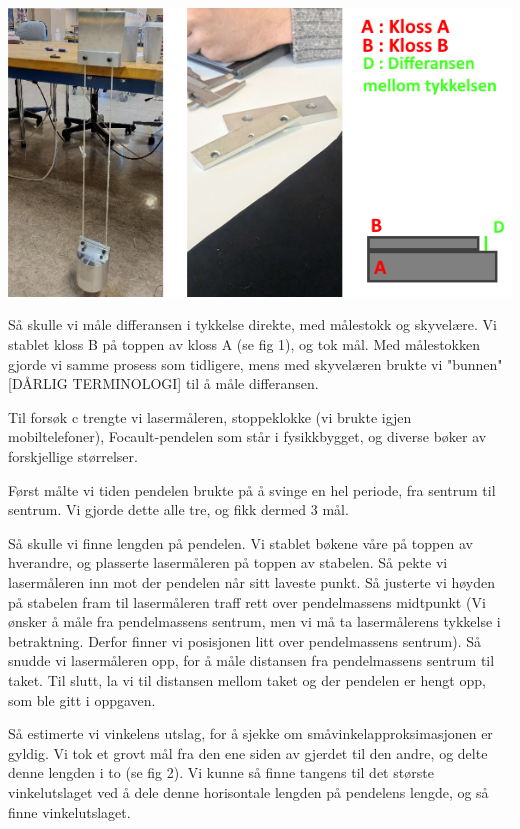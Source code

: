 \bigskip \hfil
\includegraphics[scale = 0.8]{Figurer/Lab_Fig_1.png} 
\par \bigskip

Så skulle vi måle differansen i tykkelse direkte, med målestokk og skyvelære. Vi stablet kloss B på toppen av kloss A (se fig 1), og tok mål. Med målestokken gjorde vi samme prosess som tidligere, mens med skyvelæren brukte vi "bunnen" [DÅRLIG TERMINOLOGI] til å måle differansen.\bigskip

Til forsøk c trengte vi lasermåleren, stoppeklokke (vi brukte igjen mobiltelefoner), Focault-pendelen som står i fysikkbygget, og diverse bøker av forskjellige størrelser.

Først målte vi tiden pendelen brukte på å svinge en hel periode, fra sentrum til sentrum. Vi gjorde dette alle tre, og fikk dermed 3 mål.

Så skulle vi finne lengden på pendelen. Vi stablet bøkene våre på toppen av hverandre, og plasserte lasermåleren på toppen av stabelen. Så pekte vi lasermåleren inn mot der pendelen når sitt laveste punkt. Så justerte vi høyden på stabelen fram til lasermåleren traff rett over pendelmassens midtpunkt (Vi ønsker å måle fra pendelmassens sentrum, men vi må ta lasermålerens tykkelse i betraktning. Derfor finner vi posisjonen litt over pendelmassens sentrum). Så snudde vi lasermåleren opp, for å måle distansen fra pendelmassens sentrum til taket. Til slutt, la vi til distansen mellom taket og der pendelen er hengt opp, som ble gitt i oppgaven.

Så estimerte vi vinkelens utslag, for å sjekke om småvinkelapproksimasjonen er gyldig. Vi tok et grovt mål fra den ene siden av gjerdet til den andre, og delte denne lengden i to (se fig 2). Vi kunne så finne tangens til det største vinkelutslaget ved å dele denne horisontale lengden på pendelens lengde, og så finne vinkelutslaget.

